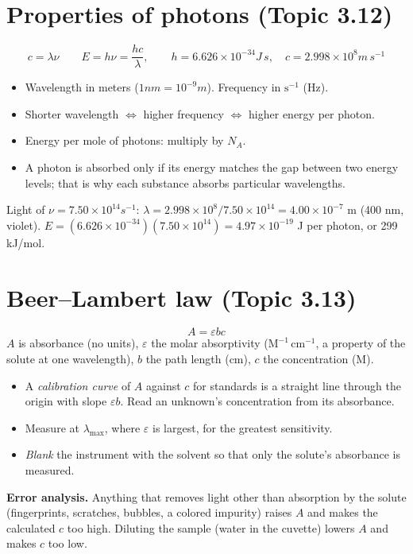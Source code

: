 \documentclass[11pt]{article}
\begin{document}
\section{Properties of photons (Topic 3.12)}\label{t:3.12}
\[ c = \lambda\nu \qquad E = h\nu = \frac{hc}{\lambda}, \qquad h = 6.626\times10^{-34}\unit{J\,s},\quad c = 2.998\times10^8\unit{m\,s^{-1}} \]
\begin{itemize}
\item Wavelength in meters ($1\unit{nm} = 10^{-9}\unit{m}$). Frequency in $\mathrm{s^{-1}}$ (Hz).
\item Shorter wavelength $\Leftrightarrow$ higher frequency $\Leftrightarrow$ higher energy per photon.
\item Energy per mole of photons: multiply by $N_A$.
\item A photon is absorbed only if its energy matches the gap between two energy levels; that is why each substance absorbs particular wavelengths.
\end{itemize}
 Light of $\nu = 7.50\times10^{14}\unit{s^{-1}}$: $\lambda = 2.998\times10^8/7.50\times10^{14} = 4.00\times10^{-7}$ m (400 nm, violet). $E = (6.626\times10^{-34})(7.50\times10^{14}) = 4.97\times10^{-19}$ J per photon, or 299 kJ/mol.

\section{Beer--Lambert law (Topic 3.13)}\label{t:3.13}
\[ A = \varepsilon b c \]
$A$ is absorbance (no units), $\varepsilon$ the molar absorptivity ($\mathrm{M^{-1}\,cm^{-1}}$, a property of the solute at one wavelength), $b$ the path length (cm), $c$ the concentration (M).
\begin{itemize}
\item A \emph{calibration curve} of $A$ against $c$ for standards is a straight line through the origin with slope $\varepsilon b$. Read an unknown's concentration from its absorbance.
\item Measure at $\lambda_{\max}$, where $\varepsilon$ is largest, for the greatest sensitivity.
\item \emph{Blank} the instrument with the solvent so that only the solute's absorbance is measured.
\end{itemize}
\textbf{Error analysis.} Anything that removes light other than absorption by the solute (fingerprints, scratches, bubbles, a colored impurity) raises $A$ and makes the calculated $c$ too high. Diluting the sample (water in the cuvette) lowers $A$ and makes $c$ too low.
\end{document}
